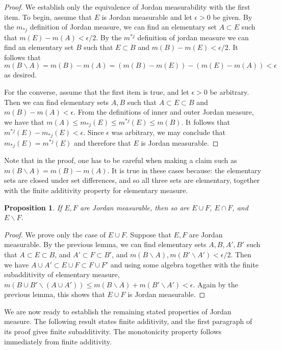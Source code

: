 \documentclass[11pt,oneside]{amsbook}
\renewcommand{\setminus}{\smallsetminus}
\theoremstyle{definition}
\theoremstyle{plain}
\newtheorem{prop}[thm]{Proposition}
\theoremstyle{definition}
\theoremstyle{remark}
\numberwithin{equation}{section}
\numberwithin{figure}{section}
\begin{document}
\begin{proof}
  We establish only the equivalence of Jordan measurability with the first item. To begin, assume that $E$ is Jordan measurable and let $\epsilon>0$ be given. By the $m_{*j}$ definition of Jordan measure, we can find an elementary set $A\subset E$ such that $m(E)-m(A)<\epsilon/2$. By the $m^{*j}$ definition of jordan measure we can find an elementary set $B$ such that $E\subset B$ and $m(B)-m(E)<\epsilon/2$. It follows that 
\[m(B\setminus A)=m(B)-m(A)=(m(B)-m(E))-(m(E)-m(A))<\epsilon
\]
as desired.

  For the converse, assume that the first item is true, and let $\epsilon>0$ be arbitrary. Then we can find elementary sets $A,B$ such that $A\subset E\subset B$ and $m(B)-m(A)<\epsilon$. From the definitions of inner and outer Jordan measure, we have that $m(A)\leq m_{*j}(E)\leq m^{*j}(E)\leq m(B)$. It follows that $m^{*j}(E)-m_{*j}(E)<\epsilon$. Since $\epsilon$ was arbitrary, we may conclude that $m_{*j}(E)=m^{*j}(E)$ and therefore that $E$ is Jordan measurable.
\end{proof}

Note that in the proof, one has to be careful when making a claim such as $m(B\setminus A)=m(B)-m(A)$. It is true in these cases because: the elementary sets are closed under set differences, and so all three sets are elementary, together with the finite additivity property for elementary measure.

\begin{prop}
  If $E,F$ are Jordan measurable, then so are $E\cup F$, $E\cap F$, and $E\setminus F$.
\end{prop}

\begin{proof}
  We prove only the case of $E\cup F$. Suppose that $E,F$ are Jordan measurable. By the previous lemma, we can find elementary sets $A,B,A',B'$ such that $A\subset E\subset B$, and $A'\subset F\subset B'$, and $m(B\setminus A),m(B'\setminus A')<\epsilon/2$. Then we have $A\cup A'\subset E\cup F\subset F\cup F'$ and using some algebra together with the finite subadditivity of elementary measure, $m(B\cup B'\setminus(A\cup A'))\leq m(B\setminus A)+m(B'\setminus A')<\epsilon$. Again by the previous lemma, this shows that $E\cup F$ is Jordan measurable.
\end{proof}

We are now ready to establish the remaining stated properties of Jordan measure. The following result states finite additivity, and the first paragraph of its proof gives finite subadditivity. The monotonicity property follows immediately from finite additivity.
\end{document}
